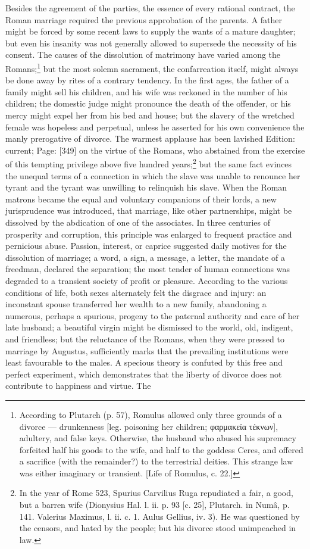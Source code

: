 Besides the agreement of the parties, the essence of every rational contract, the Roman marriage required the previous approbation of the parents. A father might be forced by some recent laws to supply the wants of a mature daughter; but even his insanity was not generally allowed to supersede the necessity of his consent. The causes of the dissolution of matrimony have varied among the Romans;\footnote{According to Plutarch (p. 57), Romulus allowed only three grounds of a divorce \texthebrew{—} drunkenness [leg. poisoning her children; \textgreek{φαρμακεία τέκνων}], adultery, and false keys. Otherwise, the husband who abused his supremacy forfeited half his goods to the wife, and half to the goddess Ceres, and offered a sacrifice (with the remainder?) to the terrestrial deities. This strange law was either imaginary or transient. [Life of Romulus, c. 22.]} but the most solemn sacrament, the confarreation itself, might always be done away by rites of a contrary tendency. In the first ages, the father of a family might sell his children, and his wife was reckoned in the number of his children; the domestic judge might pronounce the death of the offender, or his mercy might expel her from his bed and house; but the slavery of the wretched female was hopeless and perpetual, unless he asserted for his own convenience the manly prerogative of divorce. The warmest applause has been lavished Edition: current; Page: [349] on the virtue of the Romans, who abstained from the exercise of this tempting privilege above five hundred years;\footnote{In the year of Rome 523, Spurius Carvilius Ruga repudiated a fair, a good, but a barren wife (Dionysius Hal. l. ii. p. 93 [c. 25], Plutarch. in Numâ, p. 141. Valerius Maximus, l. ii. c. 1. Aulus Gellius, iv. 3). He was questioned by the censors, and hated by the people; but his divorce stood unimpeached in law.} but the same fact evinces the unequal terms of a connection in which the slave was unable to renounce her tyrant and the tyrant was unwilling to relinquish his slave. When the Roman matrons became the equal and voluntary companions of their lords, a new jurisprudence was introduced, that marriage, like other partnerships, might be dissolved by the abdication of one of the associates. In three centuries of prosperity and corruption, this principle was enlarged to frequent practice and pernicious abuse. Passion, interest, or caprice suggested daily motives for the dissolution of marriage; a word, a sign, a message, a letter, the mandate of a freedman, declared the separation; the most tender of human connections was degraded to a transient society of profit or pleasure. According to the various conditions of life, both sexes alternately felt the disgrace and injury: an inconstant spouse transferred her wealth to a new family, abandoning a numerous, perhaps a spurious, progeny to the paternal authority and care of her late husband; a beautiful virgin might be dismissed to the world, old, indigent, and friendless; but the reluctance of the Romans, when they were pressed to marriage by Augustus, sufficiently marks that the prevailing institutions were least favourable to the males. A specious theory is confuted by this free and perfect experiment, which demonstrates that the liberty of divorce does not contribute to happiness and virtue. The 